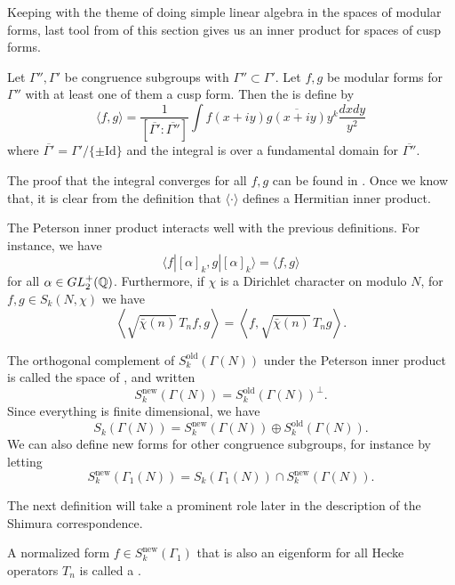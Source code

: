 \documentclass[12pt, a4paper]{amsart}
\begin{document}
Keeping with the theme of doing simple linear algebra in the spaces of modular
forms, last tool from of this section gives us an inner product for spaces
of cusp forms.

\begin{defn}
  Let $\Gamma'', \Gamma'$ be congruence subgroups with $\Gamma'' \subset
  \Gamma'$.
  Let $f, g$ be modular forms for $\Gamma''$ with at least one of them a cusp
  form. Then the  is define by
  \[\langle f,g \rangle = \frac{1}{[\overline{\Gamma'} : \overline{\Gamma''}]}
  \int f(x+iy) \overline{g(x+iy)} y^k \frac{dx dy}{y^2}\]
  where $\overline{\Gamma'} = \Gamma' / \{ \pm\text{Id}\}$ and the integral is over
  a fundamental domain for $\overline{\Gamma''}$.

  The proof that the integral converges for all $f, g$ can be found in
  \cite[Chapter III-5, page 170]{koblitz}. Once we know that, it is clear from
  the definition that $\langle \cdot \rangle$ defines a Hermitian inner product.
\end{defn}

The Peterson inner product interacts well with the previous definitions. For
instance, we have
\[\langle f | [\alpha]_k, g | [\alpha]_k \rangle = \langle f,g \rangle\]
for all $\alpha \in GL_2^+({\mathbb Q})$. Furthermore, if $\chi$ is a Dirichlet
character on modulo $N$, for $f,g \in S_k(N, \chi)$ we have
\[\left\langle \sqrt{\bar{\chi}(n)} \,T_n f, g \right\rangle = 
\left\langle f, \sqrt{\bar{\chi}(n)}\, T_n g \right\rangle.\]

\begin{defn}
  The orthogonal complement of $S_k^{\text{old}}(\Gamma(N))$ under the Peterson
  inner product is called the space of , and
  written
  \[S_k^{\text{new}}(\Gamma(N)) = S_k^{\text{old}}(\Gamma(N))^\perp.\]
  Since everything is finite dimensional, we have
  \[S_k(\Gamma(N)) = S_k^{\text{new}}(\Gamma(N)) \oplus S_k^{\text{old}}(\Gamma(N)).\]
  We can also define new forms for other congruence subgroups, for instance by
  letting
  \[S_k^{\text{new}}(\Gamma_1(N)) = S_k(\Gamma_1(N)) \cap
  S_k^{\text{new}}(\Gamma(N)).\]
\end{defn}

The next definition will take a prominent role later in the description of the
Shimura correspondence.

\begin{defn}
  A normalized form $f \in S_k^{\text{new}}(\Gamma_1)$ that is also an eigenform for all
  Hecke operators $T_n$ is called a . 
\end{defn}
\end{document}
